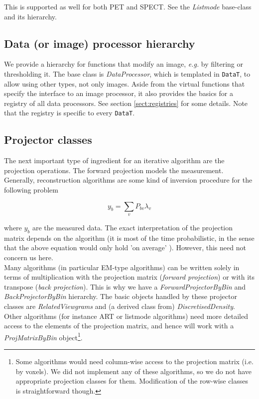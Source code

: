 \documentclass{article}
\begin{document}
This is supported as well for both PET and SPECT. See the \textit{Listmode} base-class and its hierarchy.

\subsection{
Data (or image) processor hierarchy}

We provide a hierarchy for functions that modify an image, \textit{e.g.} by 
filtering or thresholding it. The base class is \textit{DataProcessor},
which is templated in \texttt{DataT}, to allow using other types, not
only images.
Aside from the virtual functions that specify the interface to 
an image processor, it also provides the basics for a registry 
of all data processors. See section \ref{sect:registries} for some details.
Note that the registry is specific to every \texttt{DataT}.

\subsection{
Projector classes}

The next important type of ingredient for an iterative algorithm 
are the projection operations. The forward projection models 
the measurement. Generally, reconstruction algorithms are some 
kind of inversion procedure for the following problem


\[y_{b} =\sum\limits_{v}P_{bv} \lambda _{v}  \]


where $y_b$ are the measured data. The exact interpretation 
of the projection matrix depends on the algorithm (it is most 
of the time probabilistic, in the sense that the above equation 
would only hold 'on average' ). However, this need not concern 
us here.\\
Many algorithms (in particular EM-type algorithms) can be written 
solely in terms of multiplication with the projection matrix 
(\textit{forward projection}) or with its transpose (\textit{back projection}). 
This is why we have a \textit{ForwardProjectorByBin} and \textit{BackProjectorByBin} 
hierarchy. The basic objects handled by these projector classes 
are \textit{RelatedViewgrams} and (a derived class from) \textit{DiscretisedDensity}. 
Other algorithms (for instance ART or listmode algorithms) need 
more detailed access to the elements of the projection matrix, 
and hence will work with a \textit{ProjMatrixByBin} object\footnote{{\small Some 
algorithms would need column-wise access to the projection matrix 
(i.e. by voxels). We did not implement any of these algorithms, 
so we do not have appropriate projection classes for them. Modification 
of the row-wise classes is straightforward though.}}. 
\end{document}
